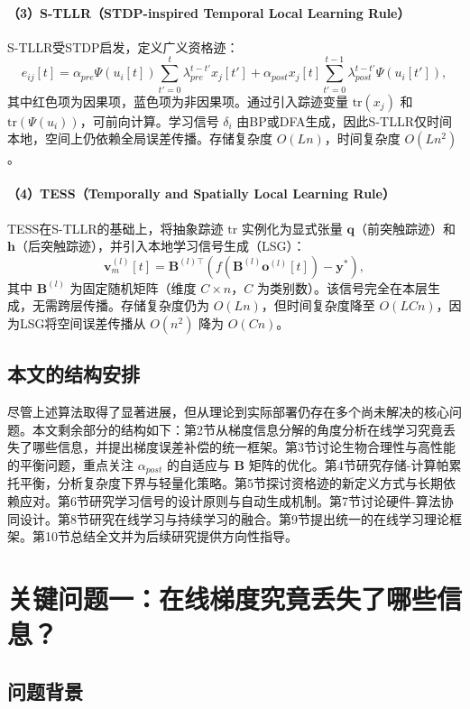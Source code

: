 \documentclass[journal,12pt,onecolumn]{IEEEtran}
\begin{document}
\paragraph{（3）S-TLLR（STDP-inspired Temporal Local Learning Rule）}
S-TLLR受STDP启发，定义广义资格迹：
\[
e_{ij}[t] = \alpha_{pre}\Psi(u_i[t])\sum_{t'=0}^{t}\lambda_{pre}^{t-t'} x_j[t'] + \alpha_{post} x_j[t]\sum_{t'=0}^{t-1}\lambda_{post}^{t-t'} \Psi(u_i[t']),
\]
其中红色项为因果项，蓝色项为非因果项。通过引入踪迹变量 \(\text{tr}(x_j)\) 和 \(\text{tr}(\Psi(u_i))\)，可前向计算。学习信号 \(\delta_i\) 由BP或DFA生成，因此S-TLLR仅时间本地，空间上仍依赖全局误差传播。存储复杂度 \(O(Ln)\)，时间复杂度 \(O(Ln^2)\)。

\paragraph{（4）TESS（Temporally and Spatially Local Learning Rule）}
TESS在S-TLLR的基础上，将抽象踪迹 \(\text{tr}\) 实例化为显式张量 \(\mathbf{q}\)（前突触踪迹）和 \(\mathbf{h}\)（后突触踪迹），并引入本地学习信号生成（LSG）：
\[
\mathbf{v}_m^{(l)}[t] = \mathbf{B}^{(l)\top} \left( f(\mathbf{B}^{(l)} \mathbf{o}^{(l)}[t]) - \mathbf{y}^* \right),
\]
其中 \(\mathbf{B}^{(l)}\) 为固定随机矩阵（维度 \(C \times n\)，\(C\) 为类别数）。该信号完全在本层生成，无需跨层传播。存储复杂度仍为 \(O(Ln)\)，但时间复杂度降至 \(O(LCn)\)，因为LSG将空间误差传播从 \(O(n^2)\) 降为 \(O(Cn)\)。

\subsection{本文的结构安排}

尽管上述算法取得了显著进展，但从理论到实际部署仍存在多个尚未解决的核心问题。本文剩余部分的结构如下：第2节从梯度信息分解的角度分析在线学习究竟丢失了哪些信息，并提出梯度误差补偿的统一框架。第3节讨论生物合理性与高性能的平衡问题，重点关注 \(\alpha_{post}\) 的自适应与 \(\mathbf{B}\) 矩阵的优化。第4节研究存储-计算帕累托平衡，分析复杂度下界与轻量化策略。第5节探讨资格迹的新定义方式与长期依赖应对。第6节研究学习信号的设计原则与自动生成机制。第7节讨论硬件-算法协同设计。第8节研究在线学习与持续学习的融合。第9节提出统一的在线学习理论框架。第10节总结全文并为后续研究提供方向性指导。

\section{关键问题一：在线梯度究竟丢失了哪些信息？}

\subsection{问题背景}
\end{document}
